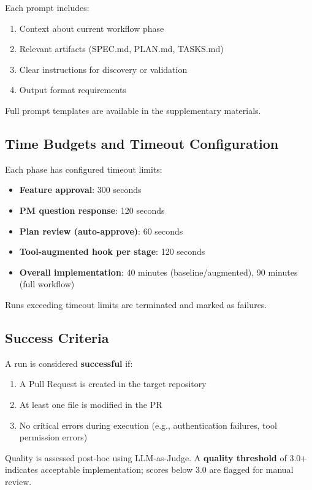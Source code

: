 \documentclass[sigconf,anonymous,review]{acmart}
\begin{document}
Each prompt includes:
\begin{enumerate}
  \item Context about current workflow phase
  \item Relevant artifacts (SPEC.md, PLAN.md, TASKS.md)
  \item Clear instructions for discovery or validation
  \item Output format requirements
\end{enumerate}

Full prompt templates are available in the supplementary materials.

\subsection{Time Budgets and Timeout Configuration}

Each phase has configured timeout limits:

\begin{itemize}
  \item \textbf{Feature approval}: 300 seconds
  \item \textbf{PM question response}: 120 seconds
  \item \textbf{Plan review (auto-approve)}: 60 seconds
  \item \textbf{Tool-augmented hook per stage}: 120 seconds
  \item \textbf{Overall implementation}: 40 minutes (baseline/augmented), 90 minutes (full workflow)
\end{itemize}

Runs exceeding timeout limits are terminated and marked as failures.

\subsection{Success Criteria}

A run is considered \textbf{successful} if:
\begin{enumerate}
  \item A Pull Request is created in the target repository
  \item At least one file is modified in the PR
  \item No critical errors during execution (e.g., authentication failures, tool permission errors)
\end{enumerate}

Quality is assessed post-hoc using LLM-as-Judge. A \textbf{quality threshold} of 3.0+ indicates acceptable implementation; scores below 3.0 are flagged for manual review.
\end{document}
